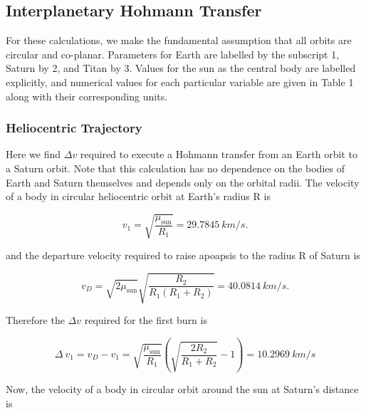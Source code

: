 \documentclass[conf]{new-aiaa}
\begin{document}
\subsection{Interplanetary Hohmann Transfer}
For these calculations, we make the fundamental assumption that all orbits are circular and co-planar. Parameters for Earth are labelled by the subscript 1, Saturn by 2, and Titan by 3. Values for the sun as the central body are labelled explicitly, and numerical values for each particular variable are given in Table 1 along with their corresponding units.

\subsubsection{Heliocentric Trajectory}

Here we find $\Delta v$ required to execute a Hohmann transfer from an Earth orbit to a Saturn orbit. Note that this calculation has no dependence on the bodies of Earth and Saturn themselves and depends only on the orbital radii. The velocity of a body in circular heliocentric orbit at Earth's radius R is

\begin{equation}
    v_1=\sqrt{\frac{ \mu_{\text{sun}} }{ R_ 1 }} = 29.7845 \ km/s.
\end{equation}

and the departure velocity required to raise apoapsis to the radius R of Saturn is

\begin{equation}
    v_D = \sqrt{2\mu_{\text{sun}}}\sqrt{\frac{R_ 2}{R_ 1(R_ 1+R_ 2)}} = 40.0814 \ km/s.
\end{equation}

Therefore the $\Delta v$ required for the first burn is

\begin{equation}
\Delta \!\ v_1 = v_D - v_ 1 = \sqrt{\frac{\mu_{\text{sun}}}{R_1}}(\sqrt{\frac{2R_ 2}{R_ 1 +R_ 2}}-1) = 10.2969 \ km/s
\end{equation}

Now, the velocity of a body in circular orbit around the sun at Saturn's distance is
\end{document}
